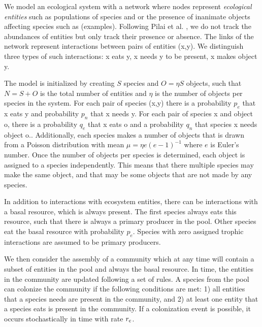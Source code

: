 \documentclass[9pt,twocolumn,twoside]{pnas-new}
\newcommand{\rr}[1]{{\rm #1}}
\begin{document}
  \footnotesize{
  We model an ecological system with a network where nodes represent \emph{ecological entities} such as populations of species and or the presence of inanimate objects affecting species such as (examples).
  Following Pilai et al. \cite{Pillai2011}, we do not track the abundances of entities but only track their presence or absence.
  The links of the network represent interactions between pairs of entities (x,y).
  We distinguish three types of such interactions: x eats y, x needs y to be present, x makes object y.


  The model is initialized by creating $S$ species and $O = \eta S$ objects, such that $N=S+O$ is the total number of entities and $\eta$ is the number of objects per species in the system.
  For each pair of species (x,y) there is a probability $p_e$ that x eats y and probability $p_n$ that x needs y.
  For each pair of species x and object o, there is a probability $q_e$ that x eats o and a probability $q_n$ that species x needs object o..
  Additionally, each species makes a number of objects that is drawn from a Poisson distribution with mean $\mu = \eta e(e-1)^{-1}$ where $e$ is Euler's number.
  Once the number of objects per species is determined, each object is assigned to a species independently.
  This means that there multiple species may make the same object, and that may be some objects that are not made by any species.

  In addition to interactions with ecosystem entities, there can be interactions with a basal resource, which is always present.
  The first species always eats this resource, such that there is always a primary producer in the pool.
  Other species eat the basal resource with probability $p_e$.
  Species with zero assigned trophic interactions are assumed to be primary producers.

  We then consider the assembly of a community which at any time will contain a subset of entities in the pool and always the basal resource.
  In time, the entities in the community are updated following a set of rules.
  A species from the pool can colonize the community if the following conditions are met:
  1) all entities that a species needs are present in the community, and
  2) at least one entity that a species eats is present in the community.
  If a colonization event is possible, it occurs stochastically in time with rate $r_\rr{c}$.

}
\end{document}
